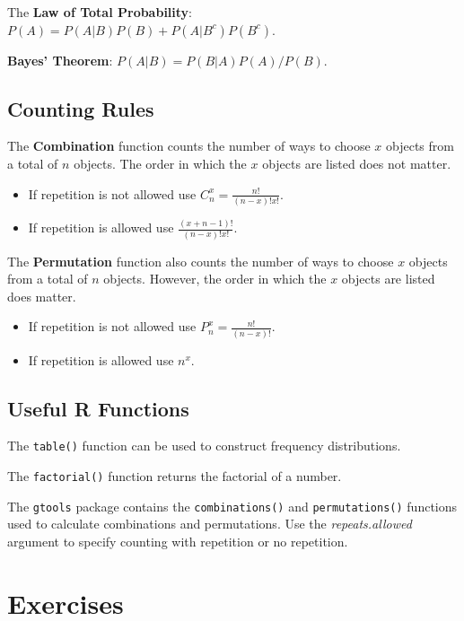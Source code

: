 \documentclass[
  letterpaper,
  DIV=11,
  numbers=noendperiod]{scrreprt}
\begin{document}
The \textbf{Law of Total Probability}:
\(P(A)=P(A|B)P(B)+P(A|B^c)P(B^c)\).

\textbf{Bayes' Theorem}: \(P(A|B)=P(B|A)P(A)/P(B)\).

\hypertarget{counting-rules}{%
\subsection*{Counting Rules}\label{counting-rules}}

The \textbf{Combination} function counts the number of ways to choose
\(x\) objects from a total of \(n\) objects. The order in which the
\(x\) objects are listed does not matter.

\begin{itemize}
\item
  If repetition is not allowed use \(C_n^x= \frac{n!}{(n-x)!x!}\).
\item
  If repetition is allowed use \(\frac{(x+n-1)!}{(n-x)!x!}\).
\end{itemize}

The \textbf{Permutation} function also counts the number of ways to
choose \(x\) objects from a total of \(n\) objects. However, the order
in which the \(x\) objects are listed does matter.

\begin{itemize}
\item
  If repetition is not allowed use \(P_n^x= \frac{n!}{(n-x)!}\).
\item
  If repetition is allowed use \(n^x\).
\end{itemize}

\hypertarget{useful-r-functions-7}{%
\subsection*{Useful R Functions}\label{useful-r-functions-7}}

The \texttt{table()} function can be used to construct frequency
distributions.

The \texttt{factorial()} function returns the factorial of a number.

The \texttt{gtools} package contains the \texttt{combinations()} and
\texttt{permutations()} functions used to calculate combinations and
permutations. Use the \emph{repeats.allowed} argument to specify
counting with repetition or no repetition.

\hypertarget{exercises-7}{%
\section{Exercises}\label{exercises-7}}
\end{document}
